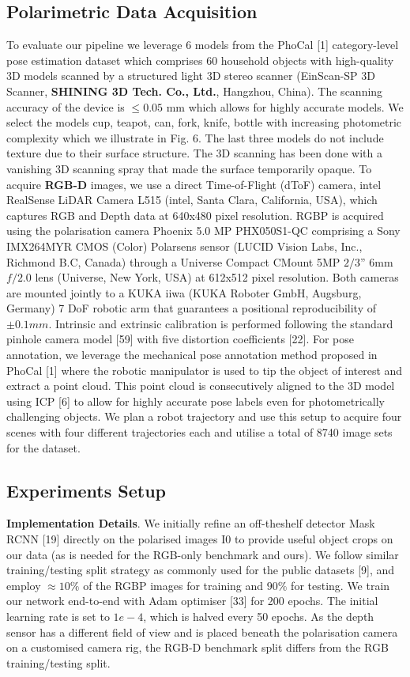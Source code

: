 \documentclass[10pt,twocolumn,letterpaper]{article}
\begin{document}
\subsection{Polarimetric Data Acquisition}
    To evaluate our pipeline we leverage 6 models from the
PhoCal [1] category-level pose estimation dataset which
comprises 60 household objects with high-quality 3D
models scanned by a structured light 3D stereo scanner
(EinScan-SP 3D Scanner, \textbf{SHINING 3D Tech. Co., Ltd.},
Hangzhou, China). The scanning accuracy of the device is
$\leq 0.05$ mm which allows for highly accurate models. We
select the models cup, teapot, can, fork, knife, bottle with
increasing photometric complexity which we illustrate in
Fig. 6. The last three models do not include texture due to
their surface structure. The 3D scanning has been done with
a vanishing 3D scanning spray that made the surface temporarily opaque. To acquire \textbf{RGB-D} images, we use a direct Time-of-Flight (dToF) camera, intel RealSense LiDAR Camera L515 (intel, Santa Clara, California, USA), which
captures RGB and Depth data at 640x480 pixel resolution. RGBP is acquired using the polarisation camera Phoenix 5.0 MP PHX050S1-QC comprising a Sony IMX264MYR CMOS (Color) Polarsens sensor (LUCID Vision Labs, Inc., Richmond B.C, Canada) through a Universe Compact CMount 5MP $2/3”$ 6mm $f/2.0$ lens (Universe, New York, USA) at 612x512 pixel resolution. Both cameras are mounted jointly to a KUKA iiwa (KUKA Roboter GmbH, Augsburg, Germany) 7 DoF robotic arm that guarantees a positional reproducibility of $\pm0.1 mm$. Intrinsic and extrinsic calibration is performed following the standard pinhole camera model [59] with five distortion coefficients [22]. For pose annotation, we leverage the mechanical pose annotation method proposed in PhoCal [1] where the robotic manipulator is used to tip the object of interest and extract a point cloud. This point cloud is consecutively aligned to the 3D model using ICP [6] to allow for highly accurate pose labels even for photometrically challenging objects. We plan a robot trajectory and use this setup to acquire four scenes with four different trajectories each and utilise a total of 8740 image sets for the dataset.
\subsection{Experiments Setup}
\textbf{Implementation Details}. We initially refine an off-theshelf detector Mask RCNN [19] directly on the polarised images I0 to provide useful object crops on our data (as is needed for the RGB-only benchmark and ours). We follow
similar training/testing split strategy as commonly used for the public datasets [9], and employ $≈ 10\%$ of the RGBP images for training and $90\%$ for testing. We train our network end-to-end with Adam optimiser [33] for 200 epochs.
The initial learning rate is set to $1e-4$, which is halved every 50 epochs. As the depth sensor has a different field of view and is placed beneath the polarisation camera on a customised camera rig, the RGB-D benchmark split differs
from the RGB training/testing split.
\end{document}
